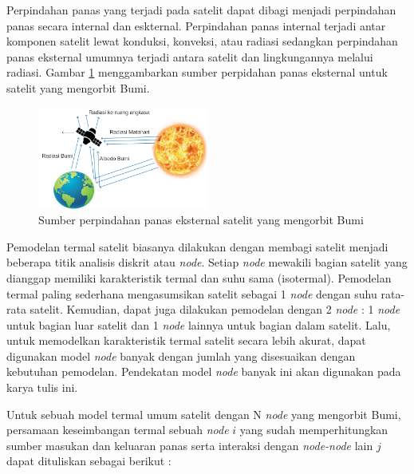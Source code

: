 Perpindahan panas yang terjadi pada satelit dapat dibagi menjadi perpindahan
panas secara internal dan eskternal. Perpindahan panas internal terjadi antar
komponen satelit lewat konduksi, konveksi, atau radiasi sedangkan perpindahan
panas eksternal umumnya terjadi antara satelit dan lingkungannya melalui
radiasi. Gambar \ref{fig:externalsource} menggambarkan sumber
perpidahan panas eksternal untuk satelit yang mengorbit Bumi.

\begin{figure}[H]
\setlength{}
\begin{center}
\includegraphics[width=0.5\textwidth]{fig/external_source.png}
	\caption[Sumber perpindahan panas eksternal satelit yang mengorbit Bumi]{Sumber perpindahan panas eksternal satelit yang mengorbit Bumi~\cite{abdelkhalek2019}}
\label{fig:externalsource}
\end{center}
\end{figure}

Pemodelan termal satelit biasanya dilakukan dengan membagi satelit menjadi
beberapa titik analisis diskrit atau \textit{node}. Setiap \textit{node}
mewakili bagian satelit yang dianggap memiliki karakteristik termal dan suhu
sama (isotermal). Pemodelan termal paling sederhana mengasumsikan satelit
sebagai 1 \textit{node} dengan suhu rata-rata satelit. Kemudian, dapat juga
dilakukan pemodelan dengan 2 \textit{node} : 1 \textit{node} untuk bagian luar
satelit dan 1 \textit{node} lainnya untuk bagian dalam satelit. Lalu, untuk
memodelkan karakteristik termal satelit secara lebih akurat, dapat digunakan
model \textit{node} banyak dengan jumlah yang disesuaikan dengan kebutuhan
pemodelan. Pendekatan model \textit{node} banyak ini akan digunakan pada karya
tulis ini.

Untuk sebuah model termal umum satelit dengan N \textit{node} yang mengorbit
Bumi, persamaan keseimbangan termal
sebuah \textit{node} $i$ yang sudah memperhitungkan sumber masukan dan keluaran
panas serta interaksi dengan \textit{node-node} lain $j$ dapat dituliskan
sebagai berikut \cite{martinez2022}:

